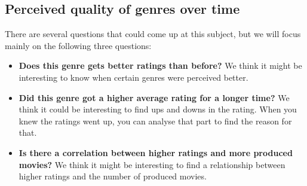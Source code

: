 \subsection{Perceived quality of genres over time }
There are several questions that could come up at this subject, but we will focus mainly on the following three questions:
\begin{itemize}
\item \textbf{Does this genre gets better ratings than before? }
We think it might be interesting to know when certain genres were perceived better. 
\item \textbf{Did this genre got a higher average rating for a longer time?}
We think it could be interesting to find ups and downs in the rating. 
When you knew the ratings went up, you can analyse that part to find the reason for that.
\item \textbf{Is there a correlation between higher ratings and more produced movies?} 
We think it might be interesting to find a relationship between higher ratings and the number of produced movies.
\end{itemize}


